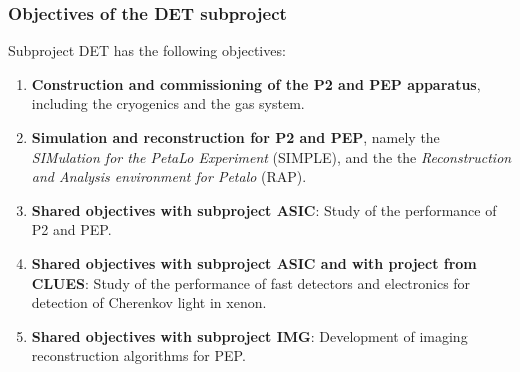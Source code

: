 \subsubsection*{Objectives of the DET subproject}
Subproject DET has the following objectives:
\begin{enumerate}
\item {\bf Construction and commissioning of the P2 and PEP apparatus}, including the cryogenics and the gas system.
\item {\bf Simulation and reconstruction for P2 and PEP}, namely the {\em SIMulation for the PetaLo Experiment} (SIMPLE), and the the {\em Reconstruction and Analysis environment for Petalo} (RAP). 
\item {\bf Shared objectives with subproject ASIC}: Study of the performance of P2 and PEP. 
\item {\bf Shared objectives with subproject ASIC and with project from CLUES}: Study of the performance of fast detectors and electronics for detection of Cherenkov light in xenon. 
\item {\bf Shared objectives with subproject IMG}: Development of imaging reconstruction algorithms for PEP. 
\end{enumerate}



